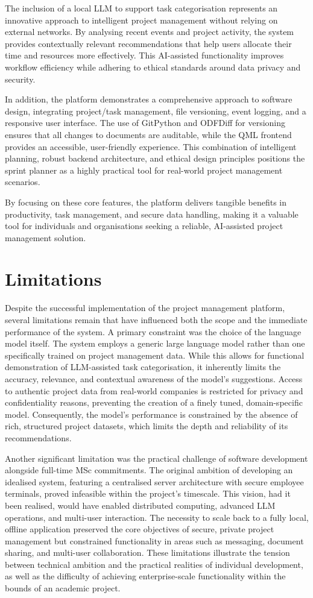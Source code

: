 \documentclass{report}
\begin{document}
The inclusion of a local LLM to support task categorisation represents an innovative approach to intelligent project management without relying on external networks. By analysing recent events and project activity, the system provides contextually relevant recommendations that help users allocate their time and resources more effectively. This AI-assisted functionality improves workflow efficiency while adhering to ethical standards around data privacy and security.

In addition, the platform demonstrates a comprehensive approach to software design, integrating project/task management, file versioning, event logging, and a responsive user interface. The use of GitPython and ODFDiff for versioning ensures that all changes to documents are auditable, while the QML frontend provides an accessible, user-friendly experience. This combination of intelligent planning, robust backend architecture, and ethical design principles positions the sprint planner as a highly practical tool for real-world project management scenarios.

By focusing on these core features, the platform delivers tangible benefits in productivity, task management, and secure data handling, making it a valuable tool for individuals and organisations seeking a reliable, AI-assisted project management solution.
\section{Limitations}
Despite the successful implementation of the project management platform, several limitations remain that have influenced both the scope and the immediate performance of the system. A primary constraint was the choice of the language model itself. The system employs a generic large language model rather than one specifically trained on project management data. While this allows for functional demonstration of LLM-assisted task categorisation, it inherently limits the accuracy, relevance, and contextual awareness of the model's suggestions. Access to authentic project data from real-world companies is restricted for privacy and confidentiality reasons, preventing the creation of a finely tuned, domain-specific model. Consequently, the model's performance is constrained by the absence of rich, structured project datasets, which limits the depth and reliability of its recommendations.

Another significant limitation was the practical challenge of software development alongside full-time MSc commitments. The original ambition of developing an idealised system, featuring a centralised server architecture with secure employee terminals, proved infeasible within the project's timescale. This vision, had it been realised, would have enabled distributed computing, advanced LLM operations, and multi-user interaction. The necessity to scale back to a fully local, offline application preserved the core objectives of secure, private project management but constrained functionality in areas such as messaging, document sharing, and multi-user collaboration. These limitations illustrate the tension between technical ambition and the practical realities of individual development, as well as the difficulty of achieving enterprise-scale functionality within the bounds of an academic project.
\end{document}

